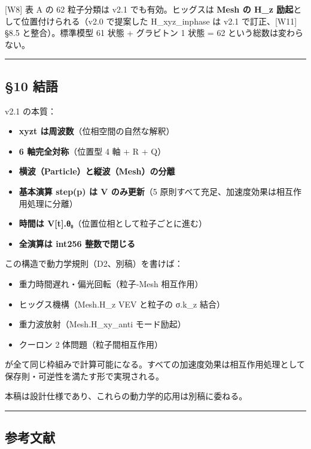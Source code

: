\documentclass[a4paper,11pt]{ltjsarticle}
\providecommand{\tightlist}{\setlength{\itemsep}{0pt}\setlength{\parskip}{0pt}}
\begin{document}
{[}W8{]} 表 A の 62 粒子分類は v2.1 でも有効。ヒッグスは \textbf{Mesh の
H\_z 励起}として位置付けられる（v2.0 で提案した H\_xyz\_inphase は v2.1
で訂正、{[}W11{]} §8.5 と整合）。標準模型 61 状態 + グラビトン 1 状態 =
62 という総数は変わらない。

\begin{center}\rule{0.5\linewidth}{0.5pt}\end{center}

\subsection{§10 結語}\label{ux7d50ux8a9e}

v2.1 の本質：

\begin{itemize}
\tightlist
\item
  \textbf{xyzt は周波数}（位相空間の自然な解釈）
\item
  \textbf{6 軸完全対称}（位置型 4 軸 + R + Q）
\item
  \textbf{横波（Particle）と縦波（Mesh）の分離}
\item
  \textbf{基本演算 step(p) は V のみ更新}（5
  原則すべて充足、加速度効果は相互作用処理に分離）
\item
  \textbf{時間は V{[}t{]}.θ₀}（位置位相として粒子ごとに進む）
\item
  \textbf{全演算は int256 整数で閉じる}
\end{itemize}

この構造で動力学規則（D2、別稿）を書けば：

\begin{itemize}
\tightlist
\item
  重力時間遅れ・偏光回転（粒子-Mesh 相互作用）
\item
  ヒッグス機構（Mesh.H\_z VEV と粒子の σ.k\_z 結合）
\item
  重力波放射（Mesh.H\_xy\_anti モード励起）
\item
  クーロン 2 体問題（粒子間相互作用）
\end{itemize}

が全て同じ枠組みで計算可能になる。すべての加速度効果は相互作用処理として保存則・可逆性を満たす形で実現される。

本稿は設計仕様であり、これらの動力学的応用は別稿に委ねる。

\begin{center}\rule{0.5\linewidth}{0.5pt}\end{center}

\subsection{参考文献}\label{ux53c2ux8003ux6587ux732e}
\end{document}
